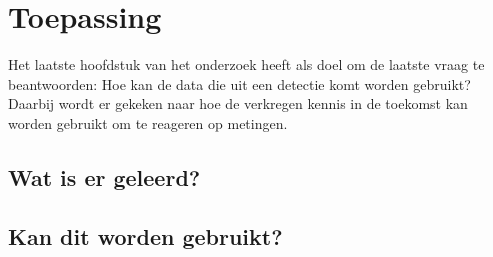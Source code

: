 \section{Toepassing}
\label{section:application}

Het laatste hoofdstuk van het onderzoek heeft als doel om de laatste vraag te beantwoorden:
Hoe kan de data die uit een detectie komt worden gebruikt?
Daarbij wordt er gekeken naar hoe de verkregen kennis in de toekomst kan worden gebruikt om te reageren op metingen.

\subsection{Wat is er geleerd?}

\subsection{Kan dit worden gebruikt?}